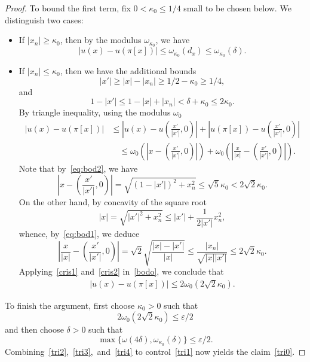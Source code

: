 \documentclass[letter,11pt]{amsart}
\newcommand{\vep}{\varepsilon}
\theoremstyle{definition}
\numberwithin{equation}{section}
\begin{document}
\begin{proof}
To bound the first term, fix $0 < \kappa_0 \leq 1/4$ small to be chosen below. 
We distinguish two cases:
\begin{itemize}
\item If $|x_n| \geq \kappa_0$, then by the modulus $\omega_{\kappa_0}$, we have
\begin{equation}
\label{tri3}
|u(x) - u(\pi[x])| \leq \omega_{\kappa_0}(d_x) \leq \omega_{\kappa_0}(\delta).
\end{equation}
\item If $|x_n| \leq \kappa_0$, then we have the additional bounds
\begin{equation}
\label{eq:bod1}
|x'| \geq |x| - |x_n| \geq 1/2 - \kappa_0 \geq 1/4,
\end{equation}
and
\begin{equation}
\label{eq:bod2}
1 - |x'| \leq 1 - |x| + |x_n| < \delta + \kappa_0 \leq 2 \kappa_0.
\end{equation}
By triangle inequality, using the modulus $\omega_0$
\begin{equation}
\label{bodo}
\begin{split}
|u(x) - u(\pi[x])| &\leq \textstyle \left|u(x) - u(\frac{x'}{|x'|},0)\right| + \left| u(\pi[x]) - u(\frac{x'}{|x'|},0)\right|\\
& \quad \leq \textstyle 
\omega_0\left(\left|x -(\frac{x'}{|x'|},0) \right|\right) +  \omega_0\left(\left|\frac{x}{|x|} - (\frac{x'}{|x'|},0) \right| \right).
\end{split}
\end{equation}
Note that by~\eqref{eq:bod2}, we have
\begin{equation}
\label{cris1}
\textstyle
\left|x -(\frac{x'}{|x'|},0) \right| = \sqrt{(1- |x'|)^2 +x_n^2}
\leq \sqrt{5}\kappa_0 < 2 \sqrt{2} \kappa_0.
\end{equation}
On the other hand, by concavity of the square root
\[
|x| = \sqrt{|x'|^2+x_n^2} \leq |x'| + \frac{1}{2 |x'|}x_n^2,
\]
whence, by~\eqref{eq:bod1}, we deduce
\begin{equation}
\label{cris2}
\textstyle
\left|\frac{x}{|x|} - (\frac{x'}{|x'|},0) \right| = \sqrt{2}\sqrt{\frac{|x|-|x'|}{|x|}}
\leq \frac{|x_n|}{\sqrt{|x||x'|}}
\leq 2 \sqrt{2} \kappa_0.
\end{equation}
Applying~\eqref{cris1} and~\eqref{cris2} in~\eqref{bodo}, we conclude that
\begin{equation}
\label{tri4}
\begin{split}
|u(x) - u(\pi[x])| 
\leq 2 \omega_0(2 \sqrt{2} \kappa_0).
\end{split}
\end{equation}
\end{itemize}

\medskip

To finish the argument,
first choose $\kappa_0 > 0$ such that 
\[
2 \omega_0(2 \sqrt{2}\kappa_0) \leq \vep/2
\]
and then choose $\delta > 0$ such that
\[
\max\{ \omega(4\delta), \omega_{\kappa_0}(\delta) \} \leq \vep/2.
\]
Combining~\eqref{tri2},~\eqref{tri3},~and~\eqref{tri4} to control~\eqref{tri1} now yields the claim~\eqref{tri0}.
\end{proof}
\end{document}
